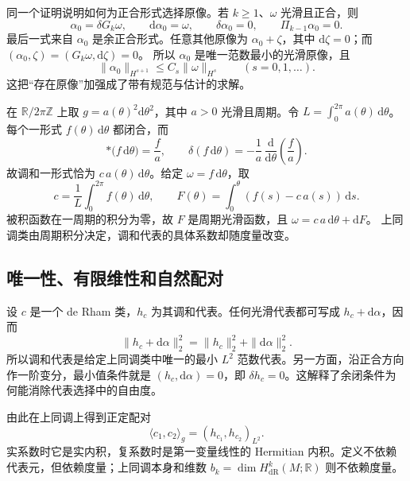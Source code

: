 同一个证明说明如何为正合形式选择原像。若 \(k\ge1\)、\(\omega\) 光滑且正合，则
\[
	\alpha_0=\delta G_k\omega,\qquad
	\mathrm d\alpha_0=\omega,\qquad
	\delta\alpha_0=0,\qquad \Pi_{k-1}\alpha_0=0.
\]
最后一式来自 \(\alpha_0\) 是余正合形式。任意其他原像为 \(\alpha_0+\zeta\)，其中 \(\mathrm d\zeta=0\)；而
\((\alpha_0,\zeta)=(G_k\omega,\mathrm d\zeta)=0\)。
所以 \(\alpha_0\) 是唯一范数最小的光滑原像，且
\[
	\|\alpha_0\|_{H^{s+1}}\le C_s\|\omega\|_{H^s}
	\qquad(s=0,1,\ldots).
\]
这把“存在原像”加强成了带有规范与估计的求解。

\begin{example}\label{g3:exm:hodge-variable-circle}
	在 \(\mathbb R/2\pi\mathbb Z\) 上取 \(g=a(\theta)^2\mathrm d\theta^2\)，其中 \(a>0\) 光滑且周期。令 \(L=\int_0^{2\pi}a(\theta)\,\mathrm d\theta\)。每个一形式 \(f(\theta)\,\mathrm d\theta\) 都闭合，而
	\[
		*\bigl(f\,\mathrm d\theta\bigr)=\frac f a,\qquad
		\delta(f\,\mathrm d\theta)
		=-\frac1a\,\frac{\mathrm d}{\mathrm d\theta}\left(\frac f a\right).
	\]
	故调和一形式恰为 \(c\,a(\theta)\,\mathrm d\theta\)。给定 \(\omega=f\,\mathrm d\theta\)，取
	\[
		c=\frac1L\int_0^{2\pi}f(\theta)\,\mathrm d\theta,\qquad
		F(\theta)=\int_0^\theta(f(s)-c\,a(s))\,\mathrm ds.
	\]
	被积函数在一周期的积分为零，故 \(F\) 是周期光滑函数，且
	\(\omega=c\,a\,\mathrm d\theta+\mathrm dF\)。
	上同调类由周期积分决定，调和代表的具体系数却随度量改变。
\end{example}

\subsection{唯一性、有限维性和自然配对}
\label{g3:subsec:1502:03}
设 \(c\) 是一个 de Rham 类，\(h_c\) 为其调和代表。任何光滑代表都可写成 \(h_c+\mathrm d\alpha\)，因而
\[
	\|h_c+\mathrm d\alpha\|_2^2
	=\|h_c\|_2^2+\|\mathrm d\alpha\|_2^2.
\]
所以调和代表是给定上同调类中唯一的最小 \(L^2\) 范数代表。另一方面，沿正合方向作一阶变分，最小值条件就是 \((h_c,\mathrm d\alpha)=0\)，即 \(\delta h_c=0\)。这解释了余闭条件为何能消除代表选择中的自由度。

\ProseParagraphBreak

由此在上同调上得到正定配对
\begin{equation}\label{g3:eq:hodge-inner-product-cohomology}
	\langle c_1,c_2\rangle_g=(h_{c_1},h_{c_2})_{L^2}.
\end{equation}
实系数时它是实内积，复系数时是第一变量线性的 Hermitian 内积。定义不依赖代表元，但依赖度量；上同调本身和维数 \(b_k=\dim H_{\mathrm{dR}}^k(M;\mathbb R)\) 则不依赖度量。

